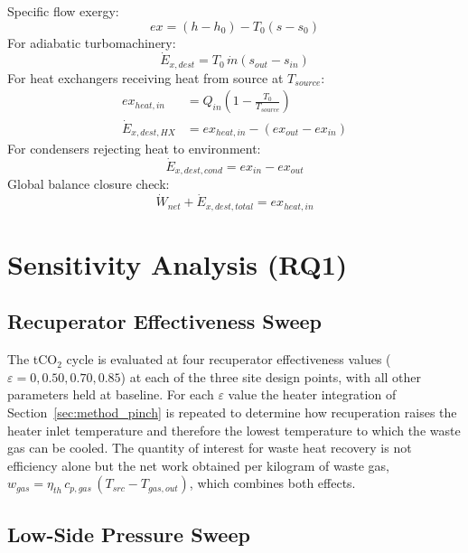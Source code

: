\documentclass[12pt,a4paper]{report}
\begin{document}
Specific flow exergy:
\begin{equation}
ex = (h - h_0) - T_0(s - s_0)
\label{eq:flow_exergy}
\end{equation}
For adiabatic turbomachinery:
\begin{equation}
\dot{E}_{x,dest} = T_0\,\dot{m}(s_{out} - s_{in})
\label{eq:adiabatic_exdest}
\end{equation}
For heat exchangers receiving heat from source at $T_{source}$:
\begin{align}
ex_{heat,in} &= Q_{in}\!\left(1 - \frac{T_0}{T_{source}}\right) \label{eq:exergy_heat}\\
\dot{E}_{x,dest,HX} &= ex_{heat,in} - (ex_{out} - ex_{in}) \label{eq:hx_exdest}
\end{align}
For condensers rejecting heat to environment:
\begin{equation}
\dot{E}_{x,dest,cond} = ex_{in} - ex_{out}
\label{eq:cond_exdest}
\end{equation}
Global balance closure check:
\begin{equation}
\dot{W}_{net} + \dot{E}_{x,dest,total} = ex_{heat,in}
\label{eq:exergy_balance}
\end{equation}

\section{Sensitivity Analysis (RQ1)}
\label{sec:method_sensitivity}

\subsection{Recuperator Effectiveness Sweep}

The tCO$_2$ cycle is evaluated at four recuperator effectiveness values
($\varepsilon = 0, 0.50, 0.70, 0.85$) at each of the three site design
points, with all other parameters held at baseline. For each $\varepsilon$
value the heater integration of Section~\ref{sec:method_pinch} is repeated to
determine how recuperation raises the heater inlet temperature and therefore
the lowest temperature to which the waste gas can be cooled. The quantity of
interest for waste heat recovery is not efficiency alone but the net work
obtained per kilogram of waste gas, $w_{gas} = \eta_{th}\,c_{p,gas}\,
(T_{src} - T_{gas,out})$, which combines both effects.

\subsection{Low-Side Pressure Sweep}
\end{document}
